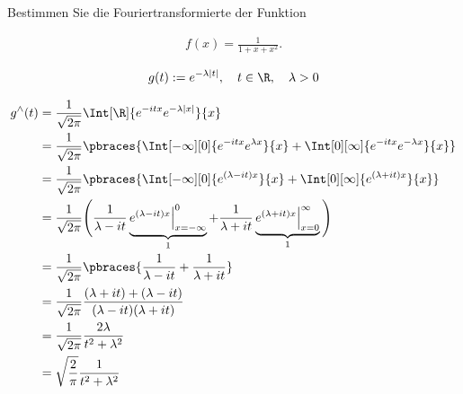 
\begin{exercise}

Bestimmen Sie die Fouriertransformierte der Funktion

\begin{align*}
    f(x)
    =
    \frac{1}{1 + x + x^2}.
\end{align*}

\end{exercise}


\begin{solution}

\begin{align*}
    g(t) := e^{-\lambda |t|},
    \quad
    t \in \R,
    \quad
    \lambda > 0
\end{align*}

\begin{align*}
    g^\wedge(t)
    & =
    \frac{1}{\sqrt{2 \pi}}
    \Int[\R]
    {
        e^{-i t x}
        e^{-\lambda |x|}
    }{x} \\
    & =
    \frac{1}{\sqrt{2 \pi}}
    \pbraces
    {
        \Int[-\infty][0]
        {
            e^{-i t x}
            e^{\lambda x}
        }{x}
        +
        \Int[0][\infty]
        {
            e^{-i t x}
            e^{-\lambda x}
        }{x}    
    } \\
    & =
    \frac{1}{\sqrt{2 \pi}}
    \pbraces
    {
        \Int[-\infty][0]
        {
            e^{(\lambda - i t) x}
        }{x}
        +
        \Int[0][\infty]
        {
            e^{(\lambda + i t) x}
        }{x}
    } \\
    & =
    \frac{1}{\sqrt{2 \pi}}
    \Bigg (
        \frac{1}{\lambda - i t}
        \underbrace
        {
            e^{(\lambda - i t) x} \Big |_{x = -\infty}^0
        }_1
        +
        \frac{1}{\lambda + i t}
        \underbrace
        {
            e^{(\lambda + i t) x} \Big |_{x=0}^\infty
        }_1
    \Bigg ) \\
    & =
    \frac{1}{\sqrt{2 \pi}}
    \pbraces
    {
        \frac{1}{\lambda - i t}
        +
        \frac{1}{\lambda + i t}
    } \\
    & =
    \frac{1}{\sqrt{2 \pi}}
    \frac
    {
        (\lambda + i t)
        +
        (\lambda - i t)
    }{
        (\lambda - i t)
        (\lambda + i t)
    } \\
    & =
    \frac{1}{\sqrt{2 \pi}}
    \frac{2 \lambda}{t^2 + \lambda^2} \\
    & =
    \sqrt \frac{2}{\pi}
    \frac{1}{t^2 + \lambda^2}
\end{align*}


\end{solution}
